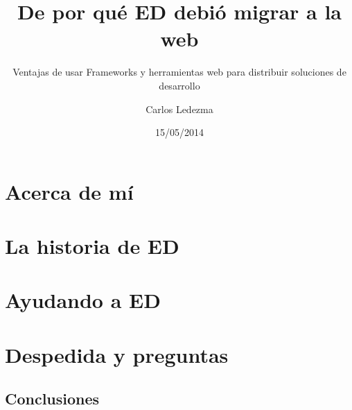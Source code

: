 \documentclass{beamer}
\title{De por qué ED debió migrar a la web}
\subtitle{Ventajas de usar Frameworks y herramientas web para distribuir
          soluciones de desarrollo}
\author{Carlos Ledezma}
\institute{Akdemia}
\date{15/05/2014}
\begin{document}
  \frame{\titlepage}

  \frame{\tableofcontents}

  \section{Acerca de mí}
    

  \section{La historia de ED}
    

  \section{Ayudando a ED}
    

  \section{Despedida y preguntas}
    \subsection{Conclusiones}
\end{document}

